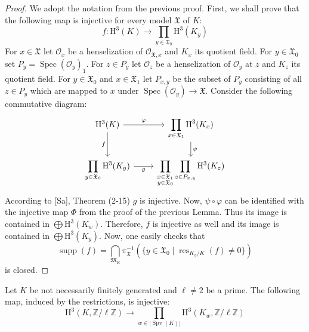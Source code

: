 \begin{proof}
We adopt the notation from the previous proof. First, we shall prove that the following map is injective for every model $\mathfrak{X}$ of $K$:
\[ f: \mathrm{H}^3(K) \to \prod_{y\in\mathfrak{X}_0}\mathrm{H}^3(K_y) \]
For $x\in\mathfrak{X}$ let $\mathcal{O}_x$ be a henselization of $\mathcal{O}_{\mathfrak{X}, x}$ and $K_x$ its quotient field. For $y\in\mathfrak{X}_0$ set $P_y=\operatorname{Spec}(\mathcal{O}_y)_1$. For $z\in P_y$ let $\mathcal{O}_z$ be a henselization of $\mathcal{O}_y$ at $z$ and $K_z$ its quotient field. For $y\in\mathfrak{X}_0$ and $x\in\mathfrak{X}_1$ let $P_{x,y}$ be the subset of $P_y$ consisting of all $z\in P_y$ which are mapped to $x$ under $\operatorname{Spec}(\mathcal{O}_y)\to\mathfrak{X}$. Consider the following commutative diagram:
\[ \begin{tikzcd}
\mathrm{H}^3(K)\ar[r, "\varphi"]\ar[d, "f"'] & \displaystyle\prod_{x\in\mathfrak{X}_1}\mathrm{H}^3(K_x)\ar[d, "\psi"]\\
\displaystyle\prod_{y\in\mathfrak{X}_0}\mathrm{H}^3(K_y) \ar[r, "g"']& \displaystyle\prod_{\substack{x\in\mathfrak{X}_1 \\ y\in\mathfrak{X}_0}}\prod_{z\in P_{x,y}}\mathrm{H}^3(K_z)
\end{tikzcd} \]
According to [Sa], Theorem (2-15) $g$ is injective. Now, $\psi\circ\varphi$ can be identified with the injective map $\Phi$ from the proof of the previous Lemma. Thus its image is contained in $\bigoplus\mathrm{H}^3(K_w)$. Therefore, $f$ is injective as well and its image is contained in $\bigoplus\mathrm{H}^3(K_y)$. Now, one easily checks that
\[ \operatorname{supp}(f) = \bigcap_{\mathfrak{M}_K} \pi_\mathfrak{X}^{-1}(\{ y\in\mathfrak{X}_0\mid \operatorname{res}_{K_y/K}(f)\neq 0 \}) \]
is closed.
\end{proof}

\begin{lemma}\label{2.4}
Let $K$ be not necessarily finitely generated and $\ell\neq 2$ be a prime. The following map, induced by the restrictions, is injective:
\[ \mathrm{H}^3(K,\mathbb{Z}/\ell\mathbb{Z})\to\prod_{w\in |\operatorname{Spv}(K)| }\mathrm{H}^3(K_w,\mathbb{Z}/\ell\mathbb{Z}) \]
\end{lemma}

